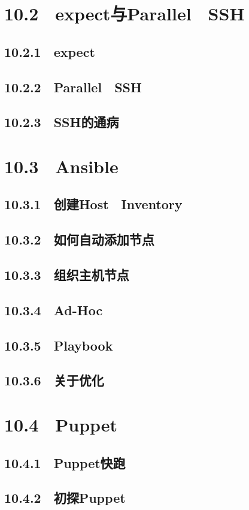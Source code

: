\documentclass[12pt,UTF8]{ctexbook}
\begin{document}
{\section{10.2　expect与Parallel　SSH}
\subsection{10.2.1　expect}
\subsection{10.2.2　Parallel　SSH}
\subsection{10.2.3　SSH的通病}
\section{10.3　Ansible}
\subsection{10.3.1　创建Host　Inventory}
\subsection{10.3.2　如何自动添加节点}
\subsection{10.3.3　组织主机节点}
\subsection{10.3.4　Ad-Hoc}
\subsection{10.3.5　Playbook}
\subsection{10.3.6　关于优化}
\section{10.4　Puppet}
\subsection{10.4.1　Puppet快跑}
\subsection{10.4.2　初探Puppet}
}
\end{document}
